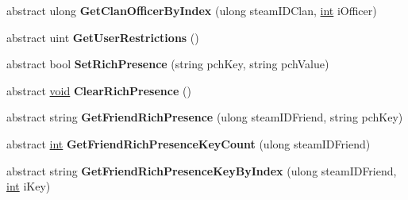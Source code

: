 \begin{DoxyCompactItemize}
\item 
\hypertarget{classValve_1_1Steamworks_1_1ISteamFriends_ae1795eee065402ea109ec695b363d9b4}{}abstract ulong {\bfseries Get\+Clan\+Officer\+By\+Index} (ulong steam\+I\+D\+Clan, \hyperlink{SDL__thread_8h_a6a64f9be4433e4de6e2f2f548cf3c08e}{int} i\+Officer)\label{classValve_1_1Steamworks_1_1ISteamFriends_ae1795eee065402ea109ec695b363d9b4}

\item 
\hypertarget{classValve_1_1Steamworks_1_1ISteamFriends_a2f5d27b7b66b2ba3da5580601a797727}{}abstract uint {\bfseries Get\+User\+Restrictions} ()\label{classValve_1_1Steamworks_1_1ISteamFriends_a2f5d27b7b66b2ba3da5580601a797727}

\item 
\hypertarget{classValve_1_1Steamworks_1_1ISteamFriends_a35930cc9a736396013edd14cbecac186}{}abstract bool {\bfseries Set\+Rich\+Presence} (string pch\+Key, string pch\+Value)\label{classValve_1_1Steamworks_1_1ISteamFriends_a35930cc9a736396013edd14cbecac186}

\item 
\hypertarget{classValve_1_1Steamworks_1_1ISteamFriends_a72984140b4663959455c3967975f3186}{}abstract \hyperlink{SDL__audio_8h_a52835ae37c4bb905b903cbaf5d04b05f}{void} {\bfseries Clear\+Rich\+Presence} ()\label{classValve_1_1Steamworks_1_1ISteamFriends_a72984140b4663959455c3967975f3186}

\item 
\hypertarget{classValve_1_1Steamworks_1_1ISteamFriends_a8c1d3bff55336b86ae0a785c425e80d5}{}abstract string {\bfseries Get\+Friend\+Rich\+Presence} (ulong steam\+I\+D\+Friend, string pch\+Key)\label{classValve_1_1Steamworks_1_1ISteamFriends_a8c1d3bff55336b86ae0a785c425e80d5}

\item 
\hypertarget{classValve_1_1Steamworks_1_1ISteamFriends_ad32a968cabd582adf738df0e9fa09ef4}{}abstract \hyperlink{SDL__thread_8h_a6a64f9be4433e4de6e2f2f548cf3c08e}{int} {\bfseries Get\+Friend\+Rich\+Presence\+Key\+Count} (ulong steam\+I\+D\+Friend)\label{classValve_1_1Steamworks_1_1ISteamFriends_ad32a968cabd582adf738df0e9fa09ef4}

\item 
\hypertarget{classValve_1_1Steamworks_1_1ISteamFriends_a920257b4a8b6bf491764ed2d1e2ec78d}{}abstract string {\bfseries Get\+Friend\+Rich\+Presence\+Key\+By\+Index} (ulong steam\+I\+D\+Friend, \hyperlink{SDL__thread_8h_a6a64f9be4433e4de6e2f2f548cf3c08e}{int} i\+Key)\label{classValve_1_1Steamworks_1_1ISteamFriends_a920257b4a8b6bf491764ed2d1e2ec78d}


\end{DoxyCompactItemize}
